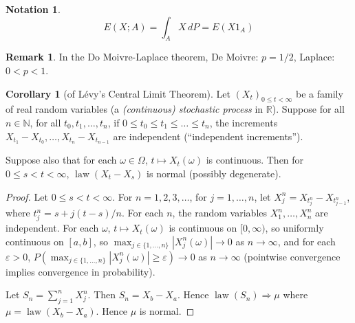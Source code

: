 \documentclass{article}
\DeclareMathOperator{\law}{law}
\newcommand{\R}{\mathbb{R}}
\newcommand{\N}{\mathbb{N}}
\theoremstyle{definition}
\newtheorem{corollary}[theorem]{Corollary}
\newtheorem*{remark}{Remark}
\newtheorem*{notation}{Notation}
\begin{document}
\begin{notation}
\[
    E(X;A) = \int_A X\,dP = E(X1_A)
\]
\end{notation}

\begin{remark}
     In the Do Moivre-Laplace theorem, De Moivre: $p = 1/2$, Laplace: $0 < p < 1$.
\end{remark}

\begin{corollary}[of Lévy's Central Limit Theorem]
    Let $(X_t)_{0 \leq t < \infty}$ be a family of real random variables (a \emph{(continuous) stochastic process} in $\R$). Suppose for all $n \in \N$, for all $t_0, t_1, \dots, t_n$, if $0 \leq t_0 \leq t_1 \leq \dots \leq t_n$, the increments $X_{t_1}-X_{t_0}, \dots, X_{t_n} - X_{t_{n-1}}$ are independent (``independent increments'').
    
    Suppose also that for each $\omega \in \Omega$, $t \mapsto X_t(\omega)$ is continuous. Then for $0 \leq s < t < \infty$, $\law(X_t - X_s)$ is normal (possibly degenerate).
\end{corollary}
\begin{proof}
    Let $0 \leq s < t < \infty$. For $n = 1, 2, 3, \dots$, for $j = 1, \dots, n$, let $X_j^n = X_{t_j^n} - X_{t_{j-1}^n}$, where $t_j^n = s + j(t-s)/n$. For each $n$, the random variables $X_1^n, \dots, X_n^n$ are independent. For each $\omega$, $t \mapsto X_t(\omega)$ is continuous on $[0, \infty)$, so uniformly continuous on $[a, b]$, so $\max_{j \in \{1, \dots, n\}} |X_j^n(\omega)| \to 0$ as $n \to \infty$, and for each $\varepsilon > 0$, $P\left(\max_{j \in \{1, \dots, n\}} |X_j^n(\omega)| \geq \varepsilon \right) \to 0$ as $n \to \infty$ (pointwise convergence implies convergence in probability).
    
    Let $S_n = \sum_{j=1}^n X_j^n$. Then $S_n = X_b - X_a$. Hence $\law(S_n) \Rightarrow \mu$ where $\mu = \law(X_b - X_a)$. Hence $\mu$ is normal.
\end{proof}
\end{document}
